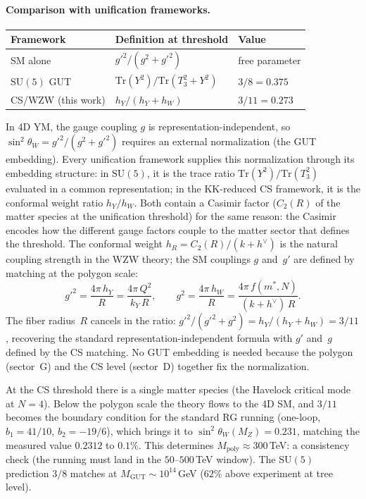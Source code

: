 \paragraph{Comparison with unification frameworks.}
\begin{center}
\renewcommand{\arraystretch}{1.2}
\begin{tabular}{lll}
\hline
Framework & Definition at threshold & Value \\
\hline
SM alone & $g'^2/(g^2 + g'^2)$ & free parameter \\
$\mathrm{SU}(5)$ GUT & $\mathrm{Tr}(Y^2)/\mathrm{Tr}(T_3^2{+}Y^2)$ &
  $3/8 = 0.375$ \\
CS/WZW (this work) & $h_Y/(h_Y + h_W)$ & $3/11 = 0.273$ \\
\hline
\end{tabular}
\end{center}
In 4D YM, the gauge coupling $g$ is representation-independent,
so $\sin^2\theta_W = g'^2/(g^2{+}g'^2)$ requires an external
normalization (the GUT embedding).
Every unification framework supplies this normalization
through its embedding structure:
in $\mathrm{SU}(5)$, it is the trace ratio
$\mathrm{Tr}(Y^2)/\mathrm{Tr}(T_3^2)$ evaluated in a common
representation;
in the KK-reduced CS framework, it is the conformal weight
ratio $h_Y/h_W$.
Both contain a Casimir factor ($C_2(R)$ of the matter species
at the unification threshold) for the same reason:
the Casimir encodes how the different gauge factors couple
to the matter sector that defines the threshold.
The conformal weight $h_R = C_2(R)/(k{+}h^\vee)$
is the natural coupling strength in the WZW theory;
the SM couplings $g$ and~$g'$ are defined by matching at
the polygon scale:
\begin{equation}\label{eq:coupling-matching}
  g'^2 = \frac{4\pi\,h_Y}{R} = \frac{4\pi\,Q^2}{k_Y\,R},
  \qquad
  g^2 = \frac{4\pi\,h_W}{R} = \frac{4\pi\,f(m^*,N)}{(k{+}h^\vee)\,R}.
\end{equation}
The fiber radius~$R$ cancels in the ratio:
$g'^2/(g'^2{+}g^2) = h_Y/(h_Y{+}h_W) = 3/11$,
recovering the standard representation-independent formula
with $g'$ and~$g$ defined by the CS matching.
No GUT embedding is needed because the polygon (sector~G)
and the CS level (sector~D) together fix the normalization.

At the CS threshold there is a single matter species
(the Havelock critical mode at $N = 4$).
Below the polygon scale the theory flows to the 4D SM,
and $3/11$ becomes the boundary condition for the standard
RG running (one-loop, $b_1 = 41/10$, $b_2 = -19/6$),
which brings it to $\sin^2\theta_W(M_Z) = 0.231$, matching
the measured value $0.2312$ to $0.1\%$.
This determines $M_{\mathrm{poly}} \approx 300$\,TeV:
a consistency check (the running must land in the
$50$--$500$\,TeV window).
The SU$(5)$ prediction $3/8$ matches at
$M_{\mathrm{GUT}} \sim 10^{14}$\,GeV
($62\%$ above experiment at tree level).

